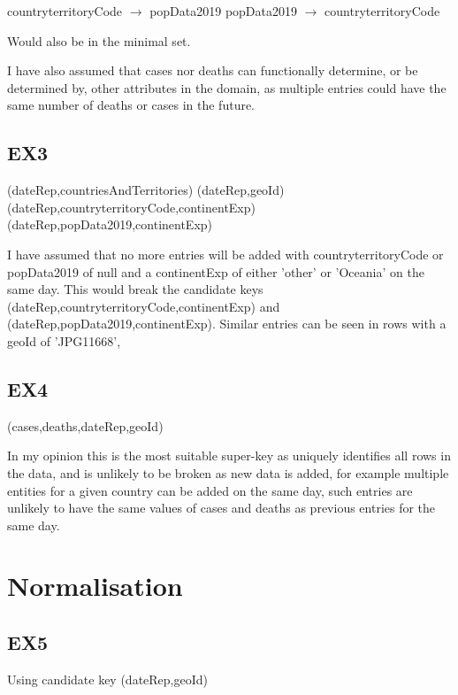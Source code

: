 \documentclass{report}
\begin{document}
	countryterritoryCode $\rightarrow$ popData2019 \newline
	popData2019 $\rightarrow$ countryterritoryCode \newline
	
	Would also be in the minimal set.\newline
	
	
	I have also assumed that cases nor deaths can functionally determine, or be determined by, other attributes in the domain, as multiple entries could have the same number of deaths or cases in the future.
	
	\subsection{EX3}
	(dateRep,countriesAndTerritories)\newline
	(dateRep,geoId)\newline
	(dateRep,countryterritoryCode,continentExp)\newline
	(dateRep,popData2019,continentExp)\newline		
	
	
	I have assumed that no more entries will be added with countryterritoryCode or popData2019 of null and a continentExp of either 'other' or 'Oceania' on the same day. This would break the candidate keys (dateRep,countryterritoryCode,continentExp) and (dateRep,popData2019,continentExp). Similar entries can be seen in rows with a geoId of 'JPG11668',
	
	\subsection{EX4}
	(cases,deaths,dateRep,geoId)\newline
	
	In my opinion this is the most suitable super-key as uniquely identifies all rows in the data, and is unlikely to be broken as new data is added, for example multiple entities for a given country can be added on the same day, such entries are unlikely to have the same values of cases and deaths as previous entries for the same day.
	
	
	\section{Normalisation}
	
	\subsection{EX5}
	Using candidate key (dateRep,geoId)\newline
	
\end{document}
